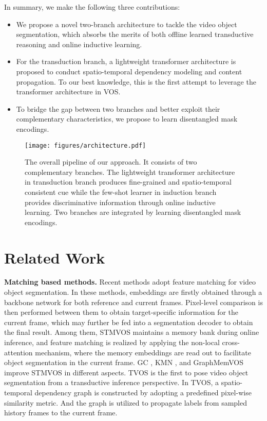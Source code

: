 \documentclass[10pt,twocolumn,letterpaper]{article}
\begin{document}
In summary, we make the following three contributions:
\begin{itemize}[itemsep= 0 pt,topsep = 0 pt, parsep=0 pt]
	\item We propose a novel two-branch architecture to tackle the video object segmentation, which absorbs the merits of both offline learned transductive reasoning and online inductive learning.
	\item For the transduction branch, a lightweight transformer architecture is proposed to conduct spatio-temporal dependency modeling and content propagation.
To our best knowledge, this is the first attempt to leverage the transformer architecture in VOS.
	\item To bridge the gap between two branches and better exploit their complementary characteristics, we propose to learn disentangled mask encodings.
\end{itemize}

\begin{figure*}
	\begin{center}
\texttt{[image: figures/architecture.pdf]}
	\vspace{-2.0em}
	\end{center}
	\caption{The overall pipeline of our approach. It consists of two complementary branches. The lightweight transformer architecture in transduction branch produces fine-grained and spatio-temporal consistent cue while the few-shot learner in induction branch provides discriminative information through online inductive learning. Two branches are integrated by learning disentangled mask encodings.}
	\label{fig:architecture}
	\vspace{-1.0em}
\end{figure*}

\section{Related Work}
\noindent\textbf{Matching based methods.}
Recent methods  \cite{li2020A,lu2020A,Seoung2019A,Seong2020A,PLM2017A,feelvos2019A,ranet2019A,CFBI2020A,Zhang2020A} adopt feature matching for video object segmentation. In these methods, embeddings are firstly obtained through a backbone network for both reference and current frames. Pixel-level comparison is then performed between them to obtain target-specific information for the current frame, which may further be fed into a segmentation decoder to obtain the final result. Among them, STMVOS \cite{Seoung2019A} maintains a memory bank during online inference, and feature matching is realized by applying the non-local cross-attention mechanism, where the memory embeddings are read out to facilitate object segmentation in the current frame. GC \cite{li2020A}, KMN \cite{Seong2020A}, and GraphMemVOS \cite{lu2020A} improve STMVOS in different aspects. TVOS \cite{Zhang2020A} is the first to pose video object segmentation from a transductive inference perspective. In TVOS, a spatio-temporal dependency graph is constructed by adopting a predefined pixel-wise similarity metric. And the graph is utilized to propagate labels from sampled history frames to the current frame.
\end{document}

